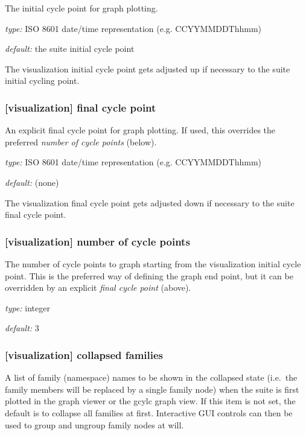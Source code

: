 The initial cycle point for graph plotting.
\begin{myitemize}
    \item {\em type:} ISO 8601 date/time representation (e.g. CCYYMMDDThhmm)
    \item {\em default:} the suite initial cycle point
\end{myitemize}
The visualization initial cycle point gets adjusted up if necessary to the
suite initial cycling point.

\subsubsection[final cycle point]{[visualization] \textrightarrow final cycle point}

An explicit final cycle point for graph plotting. If used, this overrides the
preferred {\em number of cycle points} (below).
\begin{myitemize}
    \item {\em type:} ISO 8601 date/time representation (e.g. CCYYMMDDThhmm)
    \item {\em default:} (none)
\end{myitemize}
The visualization final cycle point gets adjusted down if necessary to the
suite final cycle point.

\subsubsection[number of cycle points]{[visualization] \textrightarrow number of cycle points}

The number of cycle points to graph starting from the visualization initial
cycle point. This is the preferred way of defining the graph end point, but
it can be overridden by an explicit {\em final cycle point} (above).
\begin{myitemize}
    \item {\em type:} integer
    \item {\em default:} 3
\end{myitemize}

\subsubsection[collapsed families]{[visualization] \textrightarrow collapsed families}

A list of family (namespace) names to be shown in the collapsed state
(i.e.\ the family members will be replaced by a single family node) when
the suite is first plotted in the graph viewer or the gcylc graph view.
If this item is not set, the default is to collapse all families at first.
Interactive GUI controls can then be used to group and ungroup family
nodes at will.

